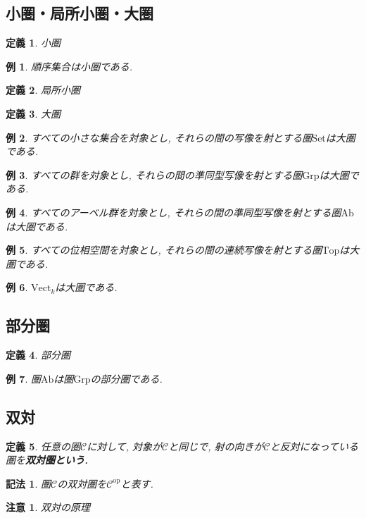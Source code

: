 \documentclass{jsbook}
\theoremstyle{plain}
\newtheorem{Def}{定義}[chapter]
\newtheorem{Notation}{記法}[chapter]
\newtheorem{caution}{注意}[chapter]
\newtheorem{example}{例}[chapter]
\begin{document}
\subsection{小圏・局所小圏・大圏}
\begin{Def}
小圏
\end{Def}
\begin{example}
順序集合は小圏である.
\end{example}
\begin{Def}
局所小圏
\end{Def}
\begin{Def}
大圏
\end{Def}

\begin{example}
すべての小さな集合を対象とし, それらの間の写像を射とする圏$\mathrm{Set}$は大圏である.
\end{example}
\begin{example}
すべての群を対象とし, それらの間の準同型写像を射とする圏$\mathrm{Grp}$は大圏である.
\end{example}
\begin{example}
すべてのアーベル群を対象とし, それらの間の準同型写像を射とする圏$\mathrm{Ab}$は大圏である.
\end{example}
\begin{example}
すべての位相空間を対象とし, それらの間の連続写像を射とする圏$\mathrm{Top}$は大圏である.
\end{example}
\begin{example}
$\mathrm{Vect}_k$は大圏である.
\end{example}
\subsection{部分圏}
\begin{Def}
部分圏
\end{Def}
\begin{example}
圏$\mathrm{Ab}$は圏$\mathrm{Grp}$の部分圏である.
\end{example}
\subsection{双対}
\begin{Def}
任意の圏$\mathscr{C}$に対して, 対象が$\mathscr{C}$と同じで, 射の向きが$\mathcal{C}$と反対になっている圏を\bf{双対圏}という.
\end{Def}
\begin{Notation}
圏$\mathscr{C}$の双対圏を$\mathscr{C}^{\mathrm{op}}$と表す.
\end{Notation}
\begin{caution}
双対の原理
\end{caution}
\end{document}
